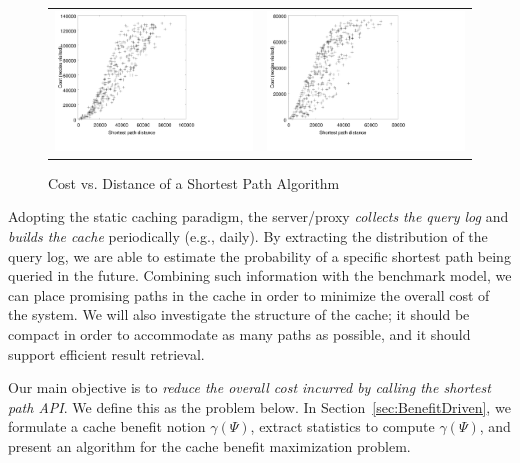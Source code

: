 \documentclass{sig-alternate}
\begin{document}
\begin{figure}[hbt]
  \center
  \begin{tabular}{@{}c@{ }c@{}}
        \includegraphics[width=0.5\columnwidth]{figures/AAL_dist}
        &
        \includegraphics[width=0.5\columnwidth]{figures/BJ_dist}
  \end{tabular}
  \caption{Cost vs. Distance of a Shortest Path Algorithm}
  \label{fig:spcost}
\end{figure}



Adopting the static caching paradigm, the server/proxy {\em collects the query log} and {\em builds the cache}
periodically (e.g., daily).
By extracting the distribution of the query log, we are able to estimate the probability of a specific shortest
path being queried in the future. Combining such information with the benchmark model, we can place
promising paths in the cache in order to minimize the overall cost of the system.
%
We will also investigate the structure of the cache;
it should be compact in order to accommodate as many paths as possible,
and it should support efficient result retrieval.






Our main objective is to {\em reduce the overall cost incurred by calling the shortest path API}.
We define this as the problem below.
In Section~\ref{sec:BenefitDriven}, we formulate a cache benefit notion $\gamma(\Psi)$,
extract statistics to compute $\gamma(\Psi)$, and present an algorithm for the cache
benefit maximization problem.
\end{document}
